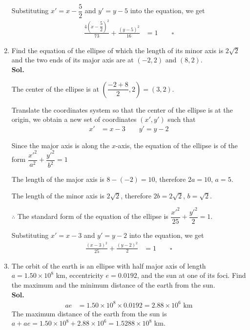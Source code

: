 \documentclass{report}
\newcommand{\sol}{\vspace{1em}\\\textbf{Sol.}}
\newcommand{\eos}{ \qquad \square}
\begin{document}
\begin{enumerate}[leftmargin=*]
          Substituting $x' = x - \dfrac{5}{2}$ and $y' = y - 5$ into the equation, we get
          \begin{align*}
              \frac{4(x - \dfrac{5}{2})^2}{73} + \frac{(y - 5)^2}{16} & = 1 \eos
          \end{align*}

    \item Find the equation of the ellipse of which the length of its minor axis is
          $2\sqrt{2}$ and the two ends of its major axis are at $(-2, 2)$ and $(8, 2)$.
          \sol{}

          The center of the ellipse is at $\left(\dfrac{-2 + 8}{2}, 2\right) = (3, 2)$.

          Translate the coordinates system so that the center of the ellipse is at the
          origin, we obtain a new set of coordinates $(x', y')$ such that
          \begin{align*}
              x' & = x - 3\qquad y' = y - 2
          \end{align*}

          Since the major axis is along the $x$-axis, the equation of the ellipse is of
          the form $\dfrac{x'^2}{a^2} + \dfrac{y'^2}{b^2} = 1$

          The length of the major axis is $8 - (-2) = 10$, therefore $2a = 10$, $a = 5$.

          The length of the minor axis is $2\sqrt{2}$, therefore $2b = 2\sqrt{2}$, $b =
              \sqrt{2}$.

          $\therefore$ The standard form of the equation of the ellipse is $\dfrac{x'^2}{25} + \dfrac{y'^2}{2} = 1$.

          Substituting $x' = x - 3$ and $y' = y - 2$ into the equation, we get
          \begin{align*}
              \frac{(x - 3)^2}{25} + \frac{(y - 2)^2}{2} & = 1 \eos
          \end{align*}

    \item The orbit of the earth is an ellipse with half major axis of length $a = 1.50
              \times 10^8$ km, eccentricity $e = 0.0192$, and the sun at one of its foci.
          Find the maximum and the minimum distance of the earth from the sun. \sol{}
          \begin{align*}
              ae & = 1.50 \times 10^8 \times 0.0192 = 2.88 \times 10^6 \text{ km}
          \end{align*}
          The maximum distance of the earth from the sun is $a + ae = 1.50 \times 10^8 + 2.88
              \times 10^6 = 1.5288 \times 10^8$ km.


\end{enumerate}
\end{document}
